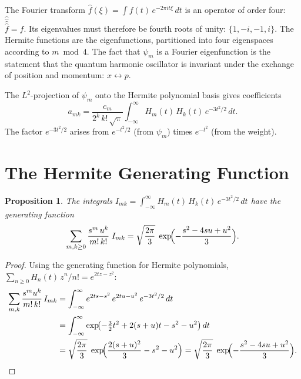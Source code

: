 \documentclass[11pt,a4paper]{article}
\theoremstyle{plain}
\newtheorem{proposition}[theorem]{Proposition}
\theoremstyle{definition}
\begin{document}
\begin{tcolorbox}[colback=yellow!10, colframe=yellow!10, boxrule=0pt,
  sharp corners]
The Fourier transform $\widehat{f}(\xi) = \int f(t)\, e^{-2\pi i
t \xi}\, dt$ is an operator of order four: $\widehat{\widehat{
\widehat{\widehat{f}}}} = f$. Its eigenvalues must therefore be
fourth roots of unity: $\{1, -i, -1, i\}$. The Hermite functions
are the eigenfunctions, partitioned into four eigenspaces according
to $m \bmod 4$. The fact that $\psi_m$ is a Fourier eigenfunction is
the statement that the quantum harmonic oscillator is invariant under
the exchange of position and momentum: $x \leftrightarrow p$.
\end{tcolorbox}

The $L^2$-projection of $\psi_m$ onto the Hermite polynomial basis
gives coefficients
\begin{equation}\label{eq:amk}
  a_{mk}
  = \frac{c_m}{2^k\, k!\,\sqrt{\pi}}
    \int_{-\infty}^{\infty} H_m(t)\, H_k(t)\, e^{-3t^2/2}\, dt.
\end{equation}
The factor $e^{-3t^2/2}$ arises from $e^{-t^2/2}$ (from $\psi_m$)
times $e^{-t^2}$ (from the weight).

\section{The Hermite Generating Function}

\begin{tcolorbox}[colback=black!5, colframe=black!5, boxrule=0pt,
  sharp corners]
\begin{proposition}\label{prop:hermite-gf}
The integrals $I_{mk} = \int_{-\infty}^{\infty} H_m(t)\, H_k(t)\,
e^{-3t^2/2}\, dt$ have the generating function
\[
  \sum_{m,k \ge 0} \frac{s^m\, u^k}{m!\, k!}\; I_{mk}
  = \sqrt{\frac{2\pi}{3}}\;
    \exp\!\Bigl(-\frac{s^2 - 4su + u^2}{3}\Bigr).
\]
\end{proposition}
\end{tcolorbox}

\begin{proof}
Using the generating function for Hermite polynomials,
$\sum_{n \ge 0} H_n(t)\, z^n / n! = e^{2tz - z^2}$:
\begin{align*}
  \sum_{m,k} \frac{s^m u^k}{m!\,k!}\, I_{mk}
  &= \int_{-\infty}^{\infty}
     e^{2ts - s^2}\, e^{2tu - u^2}\, e^{-3t^2/2}\, dt \\
  &= \int_{-\infty}^{\infty}
     \exp\!\bigl(-\tfrac{3}{2}t^2 + 2(s+u)t - s^2 - u^2\bigr)\, dt \\
  &= \sqrt{\frac{2\pi}{3}}\;
     \exp\!\Bigl(\frac{2(s+u)^2}{3} - s^2 - u^2\Bigr)
  = \sqrt{\frac{2\pi}{3}}\;
     \exp\!\Bigl(-\frac{s^2 - 4su + u^2}{3}\Bigr).
     \qedhere
\end{align*}
\end{proof}
\end{document}

